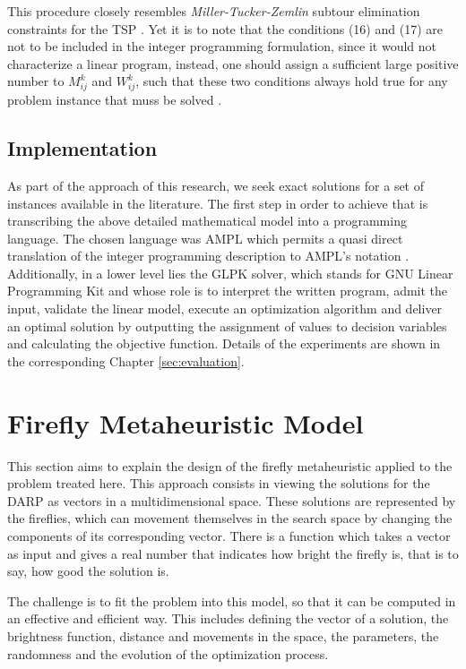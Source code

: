 \documentclass[tuberlin,cic,tc,openright,english,noabntcite,oneside]{iiufrgs}
\begin{document}
This procedure closely resembles \emph{Miller-Tucker-Zemlin} subtour elimination constraints for the TSP \parencite[p. 575]{cordeau_branch-and-cut_2006}. Yet it is to note that the conditions (16) and (17) are not to be included in the integer programming formulation, since it would not characterize a linear program, instead, one should assign a sufficient large positive number to $M_{ij}^k$ and $W_{ij}^k$, such that these two conditions always hold true for any problem instance that muss be solved \parencite[p. 44]{hall_integrated_2009}.

\subsection{Implementation}
As part of the approach of this research, we seek exact solutions for a set of instances available in the literature. The first step in order to achieve that is transcribing the above detailed mathematical model into a programming language. The chosen language was AMPL which permits a quasi direct translation of the integer programming description to AMPL's notation \parencite[p. 520]{fourer_modeling_1990}. Additionally, in a lower level lies the GLPK solver, which stands for GNU Linear Programming Kit and whose role is to interpret the written program, admit the input, validate the linear model, execute an optimization algorithm and deliver an optimal solution by outputting the assignment of values to decision variables and calculating the objective function. Details of the experiments are shown in the corresponding Chapter \ref{sec:evaluation}.

\section{Firefly Metaheuristic Model}
This section aims to explain the design of the firefly metaheuristic applied to the problem treated here. This approach consists in viewing the solutions for the DARP as vectors in a multidimensional space. These solutions are represented by the fireflies, which can movement themselves in the search space by changing the components of its corresponding vector. There is a function which takes a vector as input and gives a real number that indicates how bright the firefly is, that is to say, how good the solution is.

The challenge is to fit the problem into this model, so that it can be computed in an effective and efficient way. This includes defining the vector of a solution, the brightness function, distance and movements in the space, the parameters, the randomness and the evolution of the optimization process.
\end{document}
